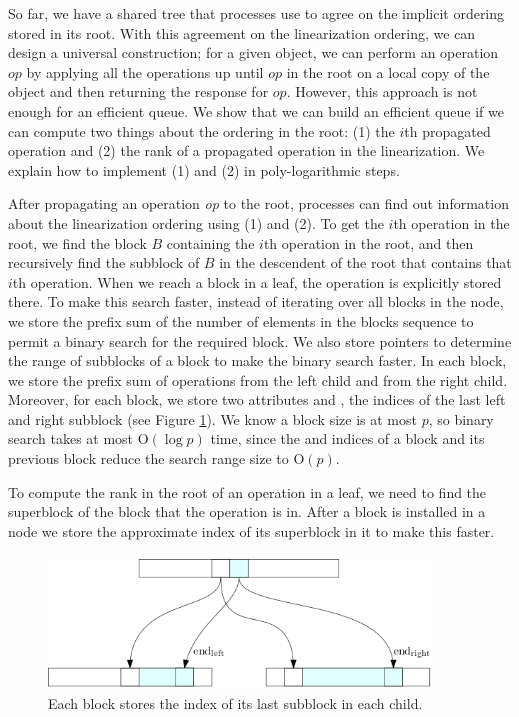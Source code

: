 \documentclass[acmsmall,nonacm,anonymous]{acmart}
\newcommand{\sub}[1]{\textsubscript{#1}}
\newcommand{\nf}[1]{{\normalfont{\texttt{#1}}}}
\begin{document}
So far, we have a shared tree that processes use to agree on the implicit ordering stored in its root. With this agreement on the linearization ordering, we can design a universal construction; for a given object, we can perform an operation $op$ by applying all the operations up until $op$ in the root on a local copy of the object and then returning the response for $op$. However, this approach is not enough for an efficient queue.
We show that we can build an efficient queue if we can compute two things about the ordering in the root: (1) the $i$th propagated operation and (2) the rank of a propagated operation in the linearization. We explain how to implement (1) and (2) in poly-logarithmic steps.

After propagating an operation \textit{op} to the root, processes can find out information about the linearization ordering using (1) and (2). 
To get the $i$th operation in the root, we find the block $B$ containing the $i$th operation in the root, and then recursively find the subblock of $B$ in the descendent of the root that contains that $i$th operation. When we reach a block in a leaf, the operation is explicitly stored there. To make this search faster, instead of iterating over all blocks in the node, we store the prefix sum of the number of elements in the blocks sequence to permit a binary search for the required block. We also store pointers to determine the range of subblocks of a block to make the binary search faster. In each block, we store the prefix sum of operations from the left child and from the right child. Moreover, for each block, we store two attributes \nf{end\sub{left}} and \nf{end\sub{right}}, the indices of the last left and right subblock (see Figure \ref{fig::pointer}). We know a block size is at most $p$, so binary search takes at most \textsc{O}$(\log p)$ time, since the \nf{end\sub{left}} and \nf{end\sub{right}} indices of a block and its previous block reduce the search range size to \textsc{O}$(p)$.

To compute the rank in the root of an operation in a leaf, we need to find the superblock of the block that the operation is in. After a block is installed in a node we store the approximate index of its superblock in it to make this faster.

\begin{figure}[hbtp]
\centering
  \includegraphics[width=4in, height=1.4in]{pics/pointers}
  \caption{Each block stores the index of its last subblock in each child. \label{fig::pointer}}
\end{figure}
\end{document}
